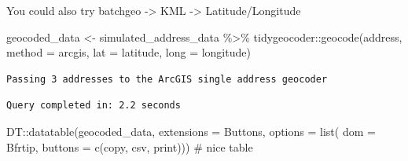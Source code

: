 \documentclass[
  letterpaper,
  DIV=11,
  numbers=noendperiod,
  oneside]{scrreprt}
\newenvironment{Shaded}{\begin{snugshade}}{\end{snugshade}}
\newcommand{\AttributeTok}[1]{\textcolor[rgb]{0.40,0.45,0.13}{#1}}
\newcommand{\CommentTok}[1]{\textcolor[rgb]{0.37,0.37,0.37}{#1}}
\newcommand{\FunctionTok}[1]{\textcolor[rgb]{0.28,0.35,0.67}{#1}}
\newcommand{\NormalTok}[1]{\textcolor[rgb]{0.00,0.23,0.31}{#1}}
\newcommand{\OtherTok}[1]{\textcolor[rgb]{0.00,0.23,0.31}{#1}}
\newcommand{\SpecialCharTok}[1]{\textcolor[rgb]{0.37,0.37,0.37}{#1}}
\newcommand{\StringTok}[1]{\textcolor[rgb]{0.13,0.47,0.30}{#1}}
\begin{document}
\begin{tcolorbox}[enhanced jigsaw, opacityback=0, colback=white, toprule=.15mm, colframe=quarto-callout-tip-color-frame, bottomrule=.15mm, title=\textcolor{quarto-callout-tip-color}{\faLightbulb}\hspace{0.5em}{Tip}, coltitle=black, toptitle=1mm, bottomtitle=1mm, arc=.35mm, breakable, colbacktitle=quarto-callout-tip-color!10!white, left=2mm, rightrule=.15mm, titlerule=0mm, leftrule=.75mm, opacitybacktitle=0.6]

You could also try batchgeo -\textgreater{} KML -\textgreater{}
Latitude/Longitude

\end{tcolorbox}

\begin{Shaded}
\begin{Highlighting}[]
\NormalTok{geocoded\_data }\OtherTok{\textless{}{-}}\NormalTok{ simulated\_address\_data }\SpecialCharTok{\%\textgreater{}\%} 
\NormalTok{  tidygeocoder}\SpecialCharTok{::}\FunctionTok{geocode}\NormalTok{(address, }
                        \AttributeTok{method =} \StringTok{\textquotesingle{}arcgis\textquotesingle{}}\NormalTok{, }
                        \AttributeTok{lat =}\NormalTok{ latitude, }
                        \AttributeTok{long =}\NormalTok{ longitude)}
\end{Highlighting}
\end{Shaded}

\begin{verbatim}
Passing 3 addresses to the ArcGIS single address geocoder
\end{verbatim}

\begin{verbatim}
Query completed in: 2.2 seconds
\end{verbatim}

\begin{Shaded}
\begin{Highlighting}[]
\NormalTok{DT}\SpecialCharTok{::}\FunctionTok{datatable}\NormalTok{(geocoded\_data,}
              \AttributeTok{extensions =} \StringTok{\textquotesingle{}Buttons\textquotesingle{}}\NormalTok{, }
              \AttributeTok{options =} \FunctionTok{list}\NormalTok{(}
                \AttributeTok{dom =} \StringTok{\textquotesingle{}Bfrtip\textquotesingle{}}\NormalTok{,}
                \AttributeTok{buttons =} \FunctionTok{c}\NormalTok{(}\StringTok{\textquotesingle{}copy\textquotesingle{}}\NormalTok{, }
                            \StringTok{\textquotesingle{}csv\textquotesingle{}}\NormalTok{, }
                            \StringTok{\textquotesingle{}print\textquotesingle{}}\NormalTok{))) }\CommentTok{\# nice table}
\end{Highlighting}
\end{Shaded}
\end{document}
